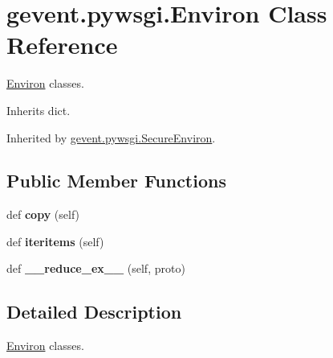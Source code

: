 \hypertarget{classgevent_1_1pywsgi_1_1_environ}{}\section{gevent.\+pywsgi.\+Environ Class Reference}
\label{classgevent_1_1pywsgi_1_1_environ}


\hyperlink{classgevent_1_1pywsgi_1_1_environ}{Environ} classes.  




Inherits dict.



Inherited by \hyperlink{classgevent_1_1pywsgi_1_1_secure_environ}{gevent.\+pywsgi.\+Secure\+Environ}.

\subsection*{Public Member Functions}
\begin{DoxyCompactItemize}
\item 
\mbox{\label{classgevent_1_1pywsgi_1_1_environ_a1a9b695b8fe5ecaeba065b1a809549d2}} 
def {\bfseries copy} (self)
\item 
\mbox{\label{classgevent_1_1pywsgi_1_1_environ_adb291ca19d2f74dcffc1c6eea20fbe86}} 
def {\bfseries iteritems} (self)
\item 
\mbox{\label{classgevent_1_1pywsgi_1_1_environ_ae27d0a708ffe24aa08536907bbd3268c}} 
def {\bfseries \+\_\+\+\_\+reduce\+\_\+ex\+\_\+\+\_\+} (self, proto)
\end{DoxyCompactItemize}


\subsection{Detailed Description}
\hyperlink{classgevent_1_1pywsgi_1_1_environ}{Environ} classes. 

